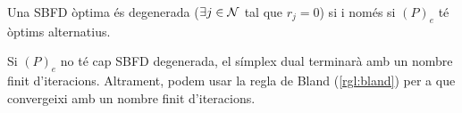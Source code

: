 \begin{prop}
    Una SBFD òptima és degenerada ($\exists j \in \mathcal{N}$ tal que $r_j = 0$) si i només si $\left(P\right)_e$ té òptims alternatius.
\end{prop}

\begin{prop}
    Si $\left(P\right)_e$ no té cap SBFD degenerada, el símplex dual terminarà amb un nombre finit d'iteracions. Altrament, podem usar la regla de Bland (\ref{rgl:bland}) per a que convergeixi amb un nombre finit d'iteracions.
\end{prop}